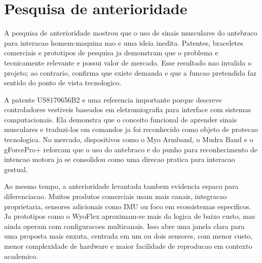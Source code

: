 \documentclass[12pt,oneside,a4paper,english,brazilian]{abntex2}
\begin{document}
\section{Pesquisa de anterioridade}

A pesquisa de anterioridade mostrou que o uso de sinais musculares do antebraco para interacao homem-maquina nao e uma ideia inedita. Patentes, braceletes comerciais e prototipos de pesquisa ja demonstram que o problema e tecnicamente relevante e possui valor de mercado. Esse resultado nao invalida o projeto; ao contrario, confirma que existe demanda e que a funcao pretendida faz sentido do ponto de vista tecnologico.

A patente US8170656B2 e uma referencia importante porque descreve controladores vestiveis baseados em eletromiografia para interface com sistemas computacionais. Ela demonstra que o conceito funcional de aprender sinais musculares e traduzi-los em comandos ja foi reconhecido como objeto de protecao tecnologica. No mercado, dispositivos como o Myo Armband, o Mudra Band e o gForcePro+ reforcam que o uso do antebraco e do punho para reconhecimento de intencao motora ja se consolidou como uma direcao pratica para interacao gestual.

Ao mesmo tempo, a anterioridade levantada tambem evidencia espaco para diferenciacao. Muitos produtos comerciais usam mais canais, integracao proprietaria, sensores adicionais como IMU ou foco em ecossistemas especificos. Ja prototipos como o WyoFlex aproximam-se mais da logica de baixo custo, mas ainda operam com configuracoes multicanais. Isso abre uma janela clara para uma proposta mais enxuta, centrada em um ou dois sensores, com menor custo, menor complexidade de hardware e maior facilidade de reproducao em contexto academico.
\end{document}
